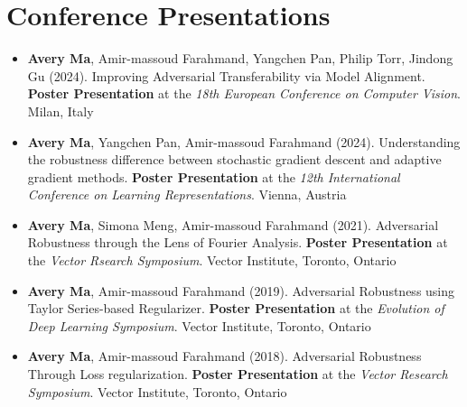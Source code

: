 \section*{Conference Presentations}
\vspace{\postsubhead}
\begin{adjustwidth}{\indentleft}{\indentright}
 \begin{itemize}
    \setlength\itemsep{0.5em}

    \item \textbf{Avery Ma}, Amir-massoud Farahmand, Yangchen Pan, Philip Torr, Jindong Gu (2024). Improving Adversarial Transferability via Model Alignment. \textbf{Poster Presentation} at the \emph{18th European Conference on Computer Vision}. Milan, Italy
    
    \item \textbf{Avery Ma}, Yangchen Pan, Amir-massoud Farahmand (2024). Understanding the robustness difference between stochastic gradient descent and adaptive gradient methods. \textbf{Poster Presentation} at the \emph{12th International Conference on Learning Representations}. Vienna, Austria

    
    \item \textbf{Avery Ma}, Simona Meng, Amir-massoud Farahmand (2021). Adversarial Robustness through the Lens of Fourier Analysis. \textbf{Poster Presentation} at the \emph{Vector Rsearch Symposium}. Vector Institute, Toronto, Ontario
    
    \item \textbf{Avery Ma}, Amir-massoud Farahmand (2019). Adversarial Robustness using Taylor Series-based Regularizer. \textbf{Poster Presentation} at the \emph{Evolution of Deep Learning Symposium}. Vector Institute, Toronto, Ontario
    
    \item \textbf{Avery Ma}, Amir-massoud Farahmand (2018). Adversarial Robustness Through Loss regularization. \textbf{Poster Presentation} at the \emph{Vector Research Symposium}. Vector Institute, Toronto, Ontario
    
    

\end{itemize}
\end{adjustwidth}
